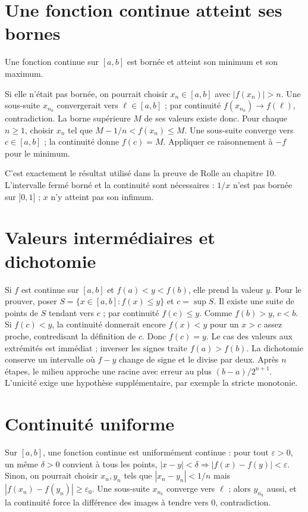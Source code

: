 \documentclass[../cours_1re.tex]{subfiles}
\begin{document}
\section{Une fonction continue atteint ses bornes}
\begin{theoreme}
Une fonction continue sur $[a,b]$ est bornée et atteint son minimum et son maximum.
\end{theoreme}
\begin{demonstration}
Si elle n'était pas bornée, on pourrait choisir $x_n\in[a,b]$ avec
$|f(x_n)|>n$. Une sous-suite $x_{n_k}$ convergerait vers $\ell\in[a,b]$ ;
par continuité $f(x_{n_k})\to f(\ell)$, contradiction.
La borne supérieure $M$ de ses valeurs existe donc.
Pour chaque $n\ge1$, choisir $x_n$ tel que $M-1/n<f(x_n)\le M$.
Une sous-suite converge vers $c\in[a,b]$ ; la continuité donne $f(c)=M$.
Appliquer ce raisonnement à $-f$ pour le minimum.
\end{demonstration}
C'est exactement le résultat utilisé dans la preuve de Rolle au chapitre 10.
L'intervalle fermé borné et la continuité sont nécessaires :
$1/x$ n'est pas bornée sur $]0,1]$ ; $x$ n'y atteint pas son infimum.

\section{Valeurs intermédiaires et dichotomie}
Si $f$ est continue sur $[a,b]$ et $f(a)<y<f(b)$, elle prend la valeur $y$.
Pour le prouver, poser $S=\{x\in[a,b]:f(x)\le y\}$ et $c=\sup S$.
Il existe une suite de points de $S$ tendant vers $c$ ; par continuité
$f(c)\le y$. Comme $f(b)>y$, $c<b$.
Si $f(c)<y$, la continuité donnerait encore $f(x)<y$ pour un $x>c$
assez proche, contredisant la définition de $c$. Donc $f(c)=y$.
Le cas des valeurs aux extrémités est immédiat ; inverser les signes
traite $f(a)>f(b)$.
La dichotomie conserve un intervalle où $f-y$ change de signe et le
divise par deux. Après $n$ étapes, le milieu approche une racine avec
erreur au plus $(b-a)/2^{n+1}$. L'unicité exige une hypothèse supplémentaire,
par exemple la stricte monotonie.

\section{Continuité uniforme}
Sur $[a,b]$, une fonction continue est uniformément continue :
pour tout $\varepsilon>0$, un même $\delta>0$ convient à tous les points,
$|x-y|<\delta\Rightarrow|f(x)-f(y)|<\varepsilon$.
Sinon, on pourrait choisir $x_n,y_n$ tels que $|x_n-y_n|<1/n$
mais $|f(x_n)-f(y_n)|\ge\varepsilon_0$.
Une sous-suite $x_{n_k}$ converge vers $\ell$ ; alors $y_{n_k}$ aussi,
et la continuité force la différence des images à tendre vers $0$,
contradiction.
\end{document}
